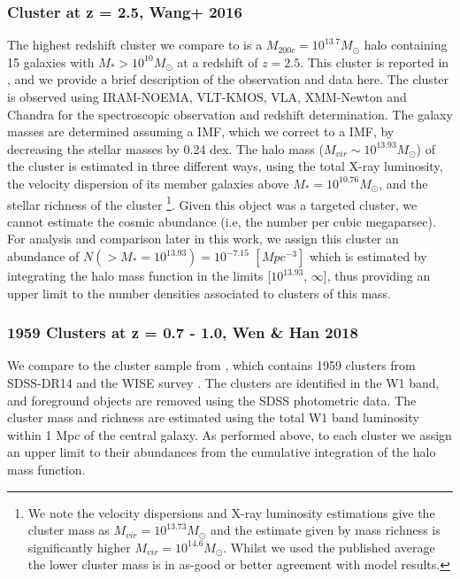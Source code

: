 \subsubsection{Cluster at z = 2.5, Wang+ 2016}
\label{subsubsec:Wang}
The highest redshift cluster we compare to is a $M_{200c} = 10^{13.7} M_{\odot}$ halo containing 15 galaxies with $M_* > 10^{10} M_{\odot}$ at a redshift of $z = 2.5$.
This cluster is reported in \citet{Wang2016DISCOVERY2.506}, and we provide a brief description of the observation and data here.
The cluster is observed using IRAM-NOEMA, VLT-KMOS, VLA, XMM-Newton and Chandra for the spectroscopic observation and redshift determination.  
The galaxy masses are determined assuming a \citet{Salpeter1955TheEvolution.} IMF, which we correct to a \citet{Chabrier2003GalacticFunction} IMF, by decreasing the stellar masses by 0.24 dex.
The halo mass ($M_{vir} \sim 10^{13.93} M_{\odot}$) of the cluster is estimated in three different ways, using the total X-ray luminosity, the velocity dispersion of its member galaxies above $M_* = 10^{10.76} M_{\odot}$, and the stellar richness of the cluster \footnote{We note the velocity dispersions and X-ray luminosity estimations give the cluster mass as $M_{vir} = 10^{13.73} M_{\odot}$ and the estimate given by mass richness is significantly higher $M_{vir} = 10^{14.6} M_{\odot}$. Whilst we used the published average the lower cluster mass is in as-good or better agreement with model results.}. Given this object was a targeted cluster, we cannot estimate the cosmic abundance (i.e, the number per cubic megaparsec). For analysis and comparison later in this work, we assign this cluster an abundance of $N(> M_*=10^{13.93})=10^{-7.15}$ $[Mpc^{-3}]$ which is estimated by integrating the halo mass function in the limits [$10^{13.93}$, $\infty$], thus providing an upper limit to the number densities associated to clusters of this mass. 

\subsubsection{1959 Clusters at z = 0.7 - 1.0, Wen \& Han 2018}
\label{subsubsec:1959}
We compare to the cluster sample from \citet{Wen2018ARedshifts}, which contains 1959 clusters from SDSS-DR14 \citep{Abolfathi2017TheExperiment} and the WISE survey \citep{Wright2010THEPERFORMANCE}. The clusters are identified in the W1 band, and foreground objects are removed using the SDSS photometric data. The cluster mass and richness are estimated using the total W1 band luminosity within 1 Mpc of the central galaxy. As performed above, to each cluster we assign an upper limit to their abundances from the cumulative integration of the halo mass function.

